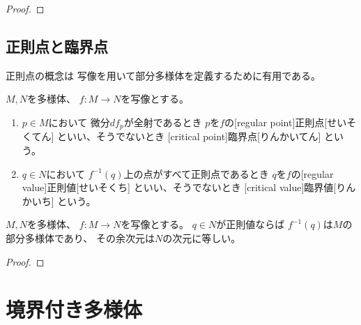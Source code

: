\documentclass[report]{jlreq}
\begin{document}
\begin{proof}
    \TODO{}
\end{proof}

\subsection{正則点と臨界点}

正則点の概念は
{\smooth}写像を用いて部分多様体を定義するために有用である。

\begin{definition}[正則点と臨界点]
    $M, N$を多様体、
    $f \colon M \to N$を{\smooth}写像とする。
    \begin{enumerate}
        \item $p \in M$において
            微分$df_p$が全射であるとき
            $p$を$f$の[regular point]{正則点}[せいそくてん]
            といい、そうでないとき
            [critical point]{臨界点}[りんかいてん]
            という。
        \item $q \in N$において
            $f^{-1}(q)$上の点がすべて正則点であるとき
            $q$を$f$の[regular value]{正則値}[せいそくち]
            といい、そうでないとき
            [critical value]{臨界値}[りんかいち]
            という。
    \end{enumerate}
\end{definition}

\begin{theorem}
    $M, N$を多様体、
    $f \colon M \to N$を{\smooth}写像とする。
    $q \in N$が正則値ならば
    $f^{-1}(q)$は$M$の部分多様体であり、
    その余次元は$N$の次元に等しい。
\end{theorem}

\begin{proof}
    \TODO{}
\end{proof}

%
\section{境界付き多様体}


\end{document}
